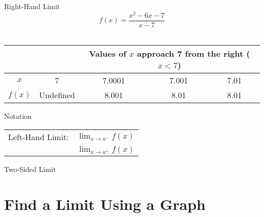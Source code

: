 \documentclass[t]{beamer}
\begin{document}
\begin{frame}{Right-Hand Limit}
    \[
    f(x) = \frac{x^2-6x-7}{x-7}
    \]
    \newline\\
    \begin{center}
    \begin{tabular}{c|c|c|c|c|}
        {} & & \multicolumn{3}{|c|}{Values of $x$ approach 7 from the right ($x < 7$)} \\ \hline
        $x$ & 7 & 7.0001 & 7.001 & 7.01 \\[6pt]
        $f(x)$ & Undefined & \alert{8.001} & \alert{8.01} & \alert{8.01} \\[8pt]
    \end{tabular}
        \end{center}
    \begin{flushright}
    \end{flushright}
\end{frame}

\begin{frame}[c]{Notation}
\begin{center}
    \begin{tabular}{p{}c}
        Left-Hand Limit: & $\lim_{x\to a^-} f(x)$ \\[18pt]
        \onslide<2->{Right-Hand Limit: & $\lim_{x\to a^+} f(x)$} \\
    \end{tabular}
\end{center}
\end{frame}

\begin{frame}[c]{Two-Sided Limit}
    \begin{center}
    \end{center}
\end{frame}


\section{Find a Limit Using a Graph}
\end{document}
